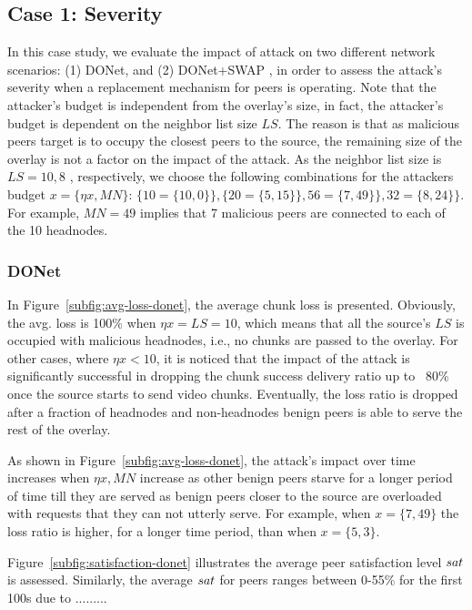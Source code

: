 \subsection{Case 1: \drop Severity}

In this case study, we evaluate the impact of \drop attack on two different network scenarios:  (1) DONet, and (2) DONet+SWAP \cite{nguyen2016swap}, in order to assess the attack's severity when a replacement mechanism for peers is operating.
Note that the attacker's budget is independent from the overlay's size, in fact, the attacker's budget is dependent on the neighbor list size $LS$.
The reason is that as malicious peers target is to occupy the closest peers to the source, the remaining size of the overlay is not a factor on the impact of the \drop attack.
As the neighbor list size is $LS=10,8$ , respectively, we choose the following combinations for the attackers budget $x={\{\eta x, MN\}}$: $\{10=\{10,0\}\}, \{20=\{5,15\}\}, 56=\{7,49\}\}, 32=\{8,24\}\}$.
For example, $MN=49$ implies that 7 malicious peers are connected to each of the 10 headnodes.

\subsubsection{DONet}
In Figure~\ref{subfig:avg-loss-donet}, the average chunk loss is presented. 
Obviously, the avg. loss is 100\% when $\eta x= LS =10$, which means that all the source's $LS$ is occupied with malicious headnodes, i.e., no chunks are passed to the overlay.
For other cases, where $\eta x < 10$, it is noticed that the impact of the attack is significantly successful in dropping the chunk success delivery ratio up to ~80\% once the source starts to send video chunks.
Eventually, the loss ratio is dropped after a fraction of headnodes and non-headnodes benign peers is able to serve the rest of the overlay.

As shown in Figure~\ref{subfig:avg-loss-donet}, the attack's impact over time increases when $\eta x, MN$ increase as other benign peers starve for a longer period of time till they are served as benign peers closer to the source are overloaded with requests that they can not utterly serve.
For example, when $x=\{7, 49\}$ the loss ratio is higher, for a longer time period, than when $x=\{5, 3\}$.

Figure~\ref{subfig:satisfaction-donet} illustrates the average peer satisfaction level $sat$ is assessed.
Similarly, the average $sat$ for peers ranges between 0-55\% for the first 100s due to ......... 

